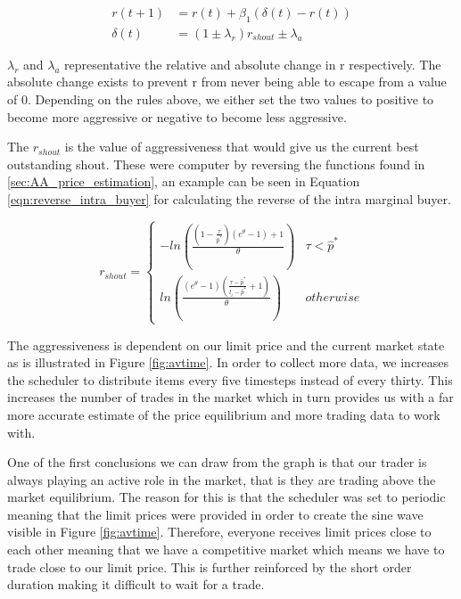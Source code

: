 \documentclass[preprint]{acm_proc_article-sp} %
\begin{document}
\begin{equation}
  \label{eqn:update_aggressive}
  \begin{aligned}
    r(t+1) &= r(t) + \beta_1(\delta(t) - r(t))\\
    \delta(t) &= (1 \pm \lambda_r)r_{shout} \pm \lambda_a
  \end{aligned}
\end{equation}

$\lambda_r$ and $\lambda_a$ representative the relative and absolute change in
r respectively. The absolute change exists to prevent r from never being able
to escape from a value of 0. Depending on the rules above, we either set the
two values to positive to become more aggressive or negative to become less
aggressive.

The $r_{shout}$ is the value of aggressiveness that would give us the current
best outstanding shout. These were computer by reversing the functions found in
\ref{sec:AA_price_estimation}, an example can be seen in Equation
\ref{eqn:reverse_intra_buyer} for calculating the reverse of the intra marginal
buyer.

\begin{equation}
\label{eqn:reverse_intra_buyer}
r_{shout}=
\begin{cases}
 -ln\left(\frac{ (1-\frac{\tau}{\hat p^*}) (e^\theta-1) + 1}{\theta}\right) & \tau
< \hat p^*\\
ln\left( \frac{(e^\theta -1) (\frac{\tau - \hat p^*}{l_i - \hat p^*} + 1)
}{\theta} \right)&
\textstyle{otherwise}
\end{cases}
\end{equation}

The aggressiveness is dependent on our limit price and the current market state as
is illustrated in Figure \ref{fig:avtime}. In order to collect more data, we
increases the scheduler to distribute items every five timesteps instead of
every thirty. This increases the number of trades in the market which in turn
provides us with a far more accurate estimate of the price equilibrium and more
trading data to work with.

One of the first conclusions we can draw from the graph is that our trader is
always playing an active role in the market, that is they are trading above the
market equilibrium. The reason for this is that the scheduler was set to
periodic meaning that the limit prices were provided in order to create the
sine wave visible in Figure \ref{fig:avtime}. Therefore, everyone receives limit
prices close to each other meaning that we have a competitive market which
means we have to trade close to our limit price. This is further reinforced by
the short order duration making it difficult to wait for a trade.
\end{document}
